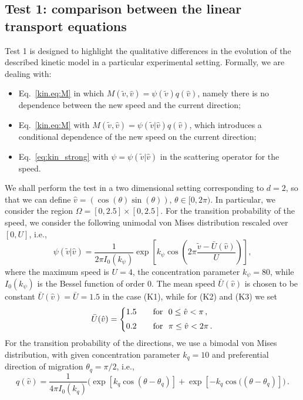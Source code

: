 \documentclass[a4paper]{article}
\makeatletter
\theoremstyle{Theorem}\newtheorem{proposition}{Proposition}[section]
\theoremstyle{Remark}\newtheorem{remark}{Remark}[section]
\theoremstyle{Theorem}\newtheorem{theorem}{Theorem}[section]
\newcommand{\hv}{\hat{v}}
\newcommand{\tv}{\tilde{v}}
\newenvironment{sistem}%
{\left\lbrace\begin{array}{@{}l@{}}}%
{\end{array}\right.}
\makeatother
\begin{document}
\subsection{Test 1: comparison between the linear transport equations}\label{sec:num_test1}
Test 1 is designed to highlight the qualitative differences in the evolution of the described kinetic model in a particular experimental setting. Formally, we are dealing with:
\begin{itemize}
    \item[(K1)] Eq.~\eqref{kin.eq:M} in which $M(\tv,\hv)=\psi(\tv)q(\hv)$, namely there is no dependence between the new speed and the current direction;
    \item[(K2)]  Eq.~\eqref{kin.eq:M} with $M(\tv,\hv)=\psi(\tv|\hv)q(\hv)$, which introduces a conditional dependence of the new speed on the current direction;
    \item[(K3)] Eq.~\eqref{eq:kin_strong} with $\psi=\psi(\tv|\hv)$ in the scattering operator for the speed. 
\end{itemize}
We shall perform the test in a two dimensional setting corresponding to $d=2$, so that we can define ${\hv=(\cos(\theta)\sin(\theta))}$, $\theta \in [0,2\pi)$. In particular, we consider the region $\Omega=[0, 2.5]\times[0,2.5]$. For the transition probability of the speed, we consider the following unimodal von Mises distribution rescaled over $[0, U]$, i.e.,
\begin{equation}\label{psi_unimodal}
    \psi(\tv|\hv)=\dfrac{1}{2\pi I_0(k_\psi)}\exp\left[k_\psi \cos\left(2\pi\dfrac{\tv-\bar{U}(\hv)}{U}\right)\right],
\end{equation}
where the maximum speed is $U=4$, the concentration parameter $k_\psi=80$, while $I_0(k_\psi)$ is the Bessel function of order 0. The mean speed $\bar{U}(\hv)$ is chosen to be constant $\bar{U}(\hv)=\bar{U}=1.5$ in the case (K1), while for (K2) and (K3) we set
\begin{equation*}
    \bar{U}(\hv)=
    \begin{sistem}
       1.5\qquad \text{for}\,\,\,\, 0\le\hv<\pi\,,\\[0.2cm]
       0.2\qquad \text{for}\,\,\,\, \pi\le\hv<2\pi\,.
    \end{sistem}    
\end{equation*}
For the transition probability of the directions, we use a bimodal von Mises distribution, with given concentration parameter $k_q=10$ and preferential direction of migration $\theta_q=\pi/2$, i.e.,
\begin{equation}\label{q_bimodal}
q(\hv)=\dfrac{1}{4\pi I_0(k_q)}\Big(\exp\left[k_q \cos(\theta-\theta_q)\right]+\exp\left[-k_q \cos((\theta-\theta_q)\right]\Big)\,.
\end{equation}
\end{document}
